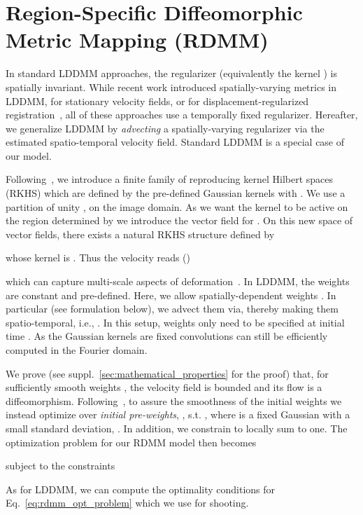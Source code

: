 \documentclass{article}
\numberwithin{equation}{section}
\newcommand{\ie}{{i.e.}}
\newcommand{\zy}[1]{{\color{black}{#1}}}
\begin{document}
\section{Region-Specific Diffeomorphic Metric Mapping (RDMM)}
\label{sec:rdmm}

In standard LDDMM approaches, the regularizer  (equivalently the kernel ) is spatially invariant. While recent work introduced spatially-varying metrics in LDDMM, for stationary velocity fields, or for displacement-regularized registration~\citep{risser2013piecewise,schmah2013left,niethammer2019_cvpr,pace2013locally}, all of these approaches use a temporally fixed regularizer. Hereafter, we generalize LDDMM by \emph{advecting} a spatially-varying  regularizer via the estimated spatio-temporal velocity field. Standard LDDMM is a special case of our model. 

Following~\citep{niethammer2019_cvpr}, we introduce  a finite family of reproducing kernel Hilbert spaces (RKHS) which are defined by the pre-defined Gaussian kernels  with . We use a partition of unity , on the image domain. As we want the kernel  to be active on the region determined by  we introduce the vector field  for . On this new space of vector fields, there exists a natural RKHS structure defined by

whose kernel is . 
 Thus the velocity reads (\zy{see suppl.~\ref{sec:kernel} for the derivation})

 which can capture multi-scale aspects of deformation~\cite{risser2010simultaneous}. In LDDMM, the weights are constant and pre-defined. Here, we allow spatially-dependent weights . In particular (see formulation below), we advect them via,  thereby making them spatio-temporal, \ie, . In this setup, weights only need to be specified at initial time . As the Gaussian kernels are fixed convolutions can still be efficiently computed in the Fourier domain.

We prove (see suppl.~\ref{sec:mathematical_properties} for the proof) that, for sufficiently smooth weights , the velocity field is bounded and its flow is a diffeomorphism. Following~\citep{niethammer2019_cvpr}, to assure the smoothness of the initial weights we instead optimize over \emph{initial pre-weights}, , s.t. , where  is a fixed Gaussian with a small standard deviation, . In addition, we constrain  to locally sum to one. The optimization problem for our RDMM model then becomes

subject to the constraints

As for LDDMM, we can compute the optimality conditions for Eq.~\eqref{eq:rdmm_opt_problem} which we use for shooting.
\end{document}
